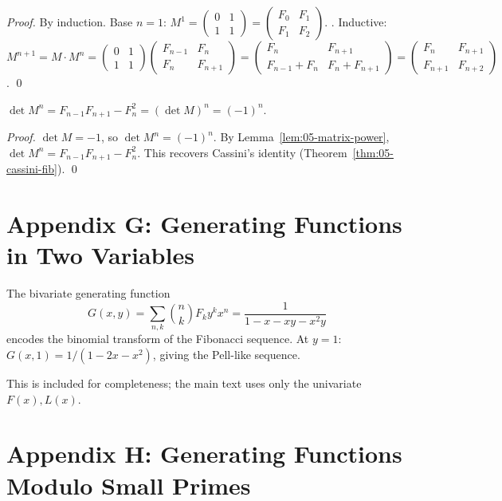 \begin{proof}
By induction. Base $n = 1$: $M^1 = \begin{pmatrix} 0 & 1 \\ 1 & 1 \end{pmatrix} =
\begin{pmatrix} F_0 & F_1 \\ F_1 & F_2 \end{pmatrix}$. \checkmark.
Inductive: $M^{n+1} = M \cdot M^n = \begin{pmatrix} 0 & 1 \\ 1 & 1 \end{pmatrix}
\begin{pmatrix} F_{n-1} & F_n \\ F_n & F_{n+1} \end{pmatrix}
= \begin{pmatrix} F_n & F_{n+1} \\ F_{n-1} + F_n & F_n + F_{n+1} \end{pmatrix}
= \begin{pmatrix} F_n & F_{n+1} \\ F_{n+1} & F_{n+2} \end{pmatrix}$. \qed
\end{proof}

\begin{corollary}
\label{cor:05-matrix-cassini}
$\det M^n = F_{n-1} F_{n+1} - F_n^2 = (\det M)^n = (-1)^n$.
\end{corollary}

\begin{proof}
$\det M = -1$, so $\det M^n = (-1)^n$. By Lemma~\ref{lem:05-matrix-power},
$\det M^n = F_{n-1} F_{n+1} - F_n^2$. This recovers Cassini's
identity (Theorem~\ref{thm:05-cassini-fib}). \qed
\end{proof}

\section*{Appendix G: Generating Functions in Two Variables}
\label{sec:05-app-G}

The bivariate generating function
\[
  G(x, y) = \sum_{n, k} \binom{n}{k} F_k y^k x^n = \frac{1}{1 - x - x y - x^2 y}
\]
encodes the binomial transform of the Fibonacci sequence. At $y = 1$:
$G(x, 1) = 1/(1 - 2x - x^2)$, giving the Pell-like sequence.

This is included for completeness; the main text uses only the
univariate $F(x), L(x)$.

\section*{Appendix H: Generating Functions Modulo Small Primes}
\label{sec:05-app-H}

